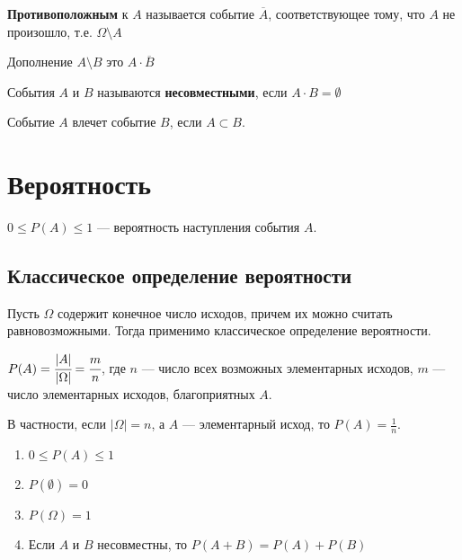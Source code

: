 \begin{definition}
    \textbf{Противоположным} к \(A\) называется событие \(\overline A\), соответствующее тому, что \(A\) не произошло, т.е. \(\Omega\setminus A\)
\end{definition}

\begin{definition}
    Дополнение \(A\setminus B\) это \(A\cdot \overline B\)
\end{definition}

\begin{definition}
    События \(A\) и \(B\) называются \textbf{несовместными}, если \(A\cdot B = \emptyset\)
\end{definition}

\begin{definition}
    Событие \(A\) влечет событие \(B\), если \(A\subset B\).
\end{definition}

\section{Вероятность}

\begin{definition}
    \(0 \leq P(A) \leq 1\) --- вероятность наступления события \(A\).
\end{definition}

\subsection{Классическое определение вероятности}

Пусть \(\Omega\) содержит конечное число исходов, причем их можно считать равновозможными. Тогда применимо классическое определение вероятности.

\(P(A) = \cfrac{|A|}{|\Omega|} = \cfrac{m}{n}\), где \(n\) --- число всех возможных элементарных исходов, \(m\) --- число элементарных исходов, благоприятных \(A\).

В частности, если \(|\Omega|= n\), а \(A\) --- элементарный исход, то \(P(A) = \frac{1}{n}\).

\begin{prop}\itemfix
    \begin{enumerate}
        \item \(0 \leq P(A) \leq 1\)
        \item \(P(\emptyset) = 0\)
        \item \(P(\Omega) = 1\)
        \item Если \(A\) и \(B\) несовместны, то \(P(A + B) = P(A) + P(B)\)
    \end{enumerate}
\end{prop}

